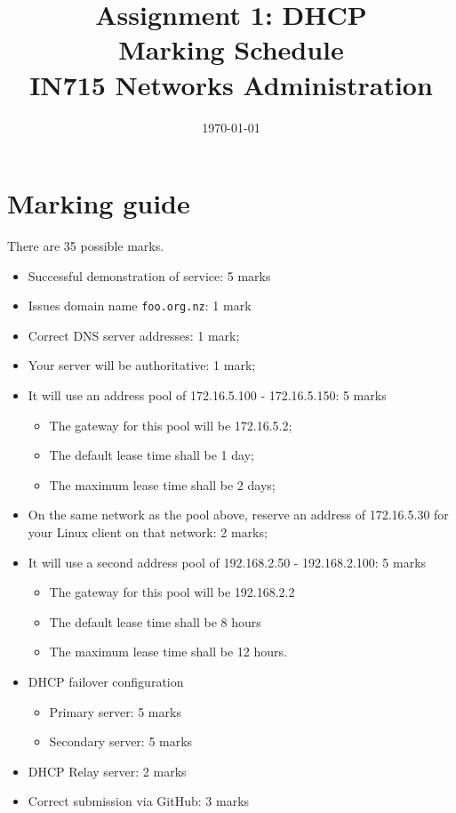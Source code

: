 \documentclass{article}
\begin{document}
\title{ Assignment 1: DHCP \\ Marking Schedule \\ IN715 Networks Administration}
\date{\today}
\maketitle



\section*{Marking guide}

There are 35 possible marks.

\begin{itemize}
  \item Successful demonstration of service: 5 marks
  \item Issues domain name \texttt{foo.org.nz}: 1 mark
  \item Correct DNS server addresses: 1 mark;
  \item Your server will be authoritative: 1 mark;
  \item It will use an address pool of 172.16.5.100 - 172.16.5.150: 5 marks
    \begin{itemize}
      \item The gateway for this pool will be 172.16.5.2;
      \item The default lease time shall be 1 day;
      \item The maximum lease time shall be 2 days;
    \end{itemize}
  \item On the same network as the pool above, reserve an address of
        172.16.5.30 for your Linux client on that network: 2 marks;
  \item It will use a second  address pool of 192.168.2.50 - 192.168.2.100: 5 marks
    \begin{itemize}
      \item The gateway for this pool will be 192.168.2.2
      \item The default lease time shall be 8 hours
      \item The maximum lease time shall be 12 hours.
    \end{itemize}
    \item DHCP failover configuration
      \begin{itemize}
      	\item Primary server: 5 marks
      	\item Secondary server: 5 marks
      \end{itemize}
    \item DHCP Relay server: 2 marks
    \item Correct submission via GitHub: 3 marks
\end{itemize}
\end{document}
